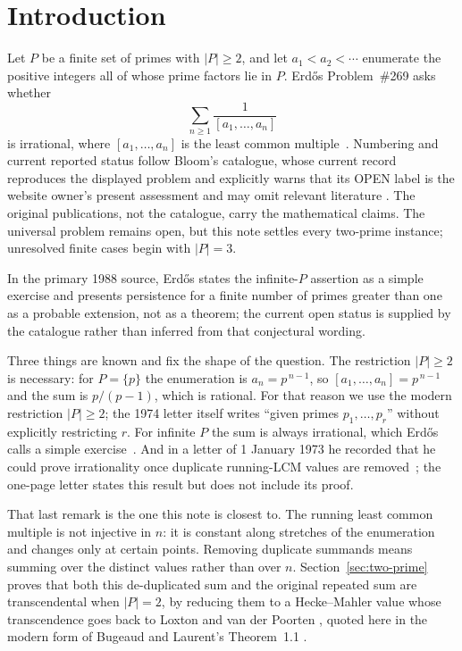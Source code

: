\documentclass[11pt]{article}
\begin{document}
\section{Introduction}\label{sec:problem}

Let $P$ be a finite set of primes with $|P|\ge2$, and let
$a_1<a_2<\cdots$ enumerate the positive integers all of whose prime factors lie
in $P$.  Erd\H{o}s Problem~\#269 asks whether
\[
 \sum_{n\ge1}\frac{1}{[a_1,\ldots,a_n]}
\]
is irrational, where $[a_1,\ldots,a_n]$ is the least common
multiple~\cite[p.~65]{erdosgraham1980}\cite[p.~106]{erdos1988}.  Numbering and
current reported status follow Bloom's catalogue, whose current record
reproduces the displayed problem and explicitly warns that its OPEN label is
the website owner's present assessment and may omit relevant literature
\cite{erdosproblems}.  The original publications, not the catalogue, carry
the mathematical claims.  The universal problem remains open, but this note
settles every two-prime instance; unresolved finite cases begin with
$|P|=3$.

In the primary 1988 source, Erd\H{o}s states
the infinite-$P$ assertion as a simple exercise and presents persistence for
a finite number of
primes greater than one as a probable extension, not as a theorem; the current
open status is supplied by the catalogue rather than inferred from that
conjectural wording.

Three things are known and fix the shape of the question.  The restriction
$|P|\ge2$ is necessary: for $P=\{p\}$ the enumeration is $a_n=p^{\,n-1}$, so
$[a_1,\ldots,a_n]=p^{\,n-1}$ and the sum is $p/(p-1)$, which is rational.  For
that reason we use the modern restriction $|P|\ge2$; the 1974 letter itself
writes ``given primes $p_1,\ldots,p_r$'' without explicitly restricting $r$.
For
infinite $P$ the sum is always irrational, which Erd\H{o}s calls a simple
exercise~\cite[p.~106]{erdos1988}.  And in a letter of 1 January 1973 he
recorded that he could prove irrationality once duplicate running-LCM values
are removed~\cite[p.~335]{erdos1974letter}; the one-page letter states this
result but does not include its proof.

That last remark is the one this note is closest to.  The running least common
multiple is not injective in $n$: it is constant along stretches of the
enumeration and changes only at certain points.  Removing duplicate summands
means summing over the distinct values rather than over $n$.
Section~\ref{sec:two-prime} proves that both this de-duplicated sum and the
original repeated sum are transcendental when $|P|=2$, by reducing them to a
Hecke--Mahler value whose transcendence goes back to Loxton and van der
Poorten \cite[Theorem~8]{loxtonvdp1977}, quoted here in the modern form of
Bugeaud and Laurent's Theorem~1.1
\cite[p.~61, Theorem~1.1]{bugeaudlaurent2023}.
\end{document}
